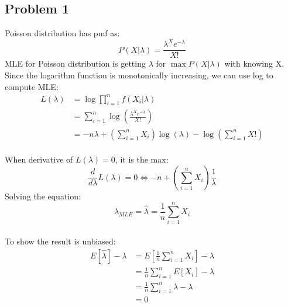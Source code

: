 \documentclass{article}
\begin{document}
\subsection{Problem 1}
Poisson distribution has pmf as: \\
\begin{displaymath}
P(X|\lambda)=\frac{{\lambda^X}{e^{-\lambda}}}{X!}
\end{displaymath}
MLE for Poisson distribution is getting $\lambda$ for $\max P(X|\lambda)$ with knowing X.\\
Since the logarithm function is monotonically increasing, we can use log to compute MLE:\\
\begin{align*}
L(\lambda)&=\log{\prod_{i=1}^n}f(X_i|\lambda)\\
			&=\sum_{i=1}^n \log(\frac{\lambda^X e^{-\lambda}}{X!})\\
			&=-n\lambda + (\sum_{i=1}^n X_i)\log(\lambda)-\log(\sum_{i=1}^n X!)
\end{align*}\\

When derivative of $L(\lambda)=0$, it is the max:\\
\begin{displaymath}	
\frac{d}{d\lambda}L(\lambda)=0 \Leftrightarrow -n+(\sum_{i=1}^n X_i)\frac{1}{\lambda}
\end{displaymath}
Solving the equation:\\
\begin{displaymath}
\lambda_{MLE}=\hat{\lambda}=\frac{1}{n}\sum_{i=1}^n X_i
\end{displaymath}\\

To show the result is unbiased:\\
\begin{align*}
E[\hat \lambda]-\lambda&=E[\frac{1}{n}\sum_{i=1}^n X_i]-\lambda\\
							&=\frac{1}{n}\sum_{i=1}^n E[X_i]-\lambda\\
							&=\frac{1}{n}\sum_{i=1}^n \lambda-\lambda\\
							&=0
\end{align*}



 
\end{document}
